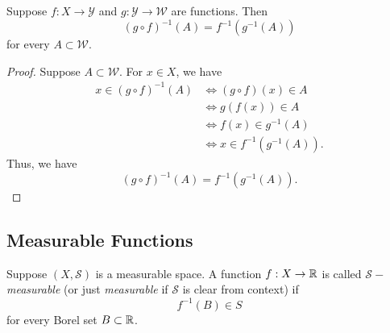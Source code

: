 \documentclass[11pt,a4paper]{book}
\begin{document}
\begin{prop}
    Suppose \( f: X \to \mathcal{Y} \) and \( g: \mathcal{Y} \to \mathcal{W} \) are functions. Then
    \[ (g \circ f)^{-1}(A) = f^{-1}(g^{-1}(A))   \]
    for every \( A \subset \mathcal{W} \).
\end{prop}
\begin{proof}
Suppose \( A \subset \mathcal{W} \). For \( x \in X  \), we have
\begin{align*}
    x \in (g \circ f)^{-1}(A) &\iff (g \circ f)(x) \in A  \\
                              &\iff g(f(x)) \in A \\
                              &\iff f(x) \in g^{-1}(A) \\
                              &\iff  x \in f^{-1}(g^{-1}(A)). 
\end{align*}
Thus, we have 
\[ (g \circ f)^{-1}(A) = f^{-1}(g^{-1}(A)).  \]
\end{proof}

\subsection{Measurable Functions}

\begin{definition}
Suppose \( (X,\mathcal{S}) \) is a measurable space. A function \( f: X \to \mathbb{R}  \) is called \textit{\( \mathcal{S} -  \)measurable } (or just \textit{measurable} if \( \mathcal{S} \) is clear from context) if  
\[  f^{-1}(B) \in S \]
for every Borel set \( B \subset \mathbb{R} \).
\end{definition}
\end{document}

